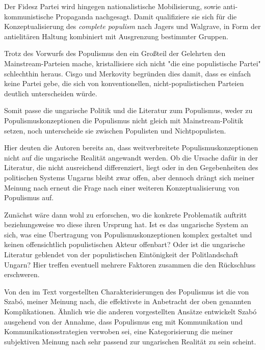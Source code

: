 \documentclass[11pt]{report}
\begin{document}
Der Fidesz Partei wird hingegen nationalistische Mobilisierung, sowie anti-kommunistische Propaganda nachgesagt. Damit qualifiziere sie sich für die Konzeptualisierung des \emph{complete populism} nach Jagers und Walgrave, in Form der antielitären Haltung kombiniert mit Ausgrenzung bestimmter Gruppen.

Trotz des Vorwurfs des Populismus den ein Großteil der Gelehrten den Mainstream-Parteien mache, kristallisiere sich nicht "die eine populistische Partei" schlechthin heraus. Cisgo und Merkovity begründen dies damit, dass es einfach keine Partei gebe, die sich von konventionellen, nicht-populistischen Parteien deutlich unterscheiden würde.

Somit passe die ungarische Politik und die Literatur zum Populismus, weder zu Populismuskonzeptionen die Populismus nicht gleich mit Mainstream-Politik setzen, noch unterscheide sie zwischen Populisten und Nichtpopulisten.

Hier deuten die Autoren bereits an, dass weitverbreitete Populismuskonzeptionen nicht auf die ungarische Realität angewandt werden. Ob die Ursache dafür in der Literatur, die nicht ausreichend differenziert, liegt oder in den Gegebenheiten des politischen Systems Ungarns bleibt zwar offen, aber dennoch drängt sich meiner Meinung nach erneut die Frage nach einer weiteren Konzeptualisierung von Populismus auf.

Zunächst wäre dann wohl zu erforschen, wo die konkrete Problematik auftritt beziehungsweise wo diese ihren Ursprung hat. Ist es das ungarische System an sich, was eine Übertragung von Populismuskonzeptionen komplex gestaltet und keinen offensichtlich populistischen Akteur offenbart? Oder ist die ungarische Literatur geblendet von der populistischen Eintönigkeit der Politlandschaft Ungarn? Hier treffen eventuell mehrere Faktoren zusammen die den Rückschluss erschweren.

Von den im Text vorgestellten Charakterisierungen des Populismus ist die von Szabó, meiner Meinung nach, die effektivste in Anbetracht der oben genannten Komplikationen. Ähnlich wie die anderen vorgestellten Ansätze entwickelt Szabó ausgehend von der Annahme, dass Populismus eng mit Kommunikation und Kommunikationsstrategien verwoben sei, eine Kategorisierung die meiner subjektiven Meinung nach sehr passend zur ungarischen Realität zu sein scheint. 
\end{document}
